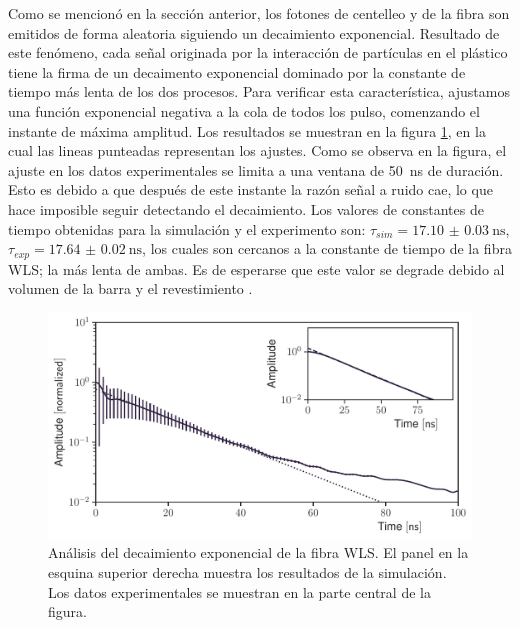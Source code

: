 Como se mencionó en la sección anterior, los fotones de centelleo y de la fibra son emitidos de forma aleatoria siguiendo un decaimiento exponencial. Resultado de este fenómeno, cada señal originada por la interacción de partículas en el plástico tiene la firma de un decaimento exponencial dominado por la constante de tiempo más lenta de los dos procesos. Para verificar esta característica, ajustamos una función exponencial negativa a la cola de todos los pulso, comenzando el instante de máxima amplitud. Los resultados se muestran en la figura \ref{fig:muons-tail}, en la cual las lineas punteadas representan los ajustes. Como se observa en la figura, el ajuste en los datos experimentales se limita a una ventana de \SI{50}{\ns} de duración. Esto es debido a que después de este instante la razón señal a ruido cae, lo que hace imposible seguir detectando el decaimiento. Los valores de constantes de tiempo obtenidas para la simulación y el experimento son: $\tau_{sim}=\SI{17.10(3)}{\ns}$, $\tau_{exp}=\SI{17.64(2)}{\ns}$, los cuales son cercanos a la constante de tiempo de la fibra WLS; la más lenta de ambas. Es de esperarse que este valor se degrade debido al volumen de la barra y el revestimiento \cite{gros18}.

\begin{figure}
        \centering
        \includegraphics[width=\textwidth]{muons-tail-fit.pdf}
        \caption{Análisis del decaimiento exponencial de la fibra WLS. El panel en la esquina superior derecha muestra los resultados de la simulación. Los datos experimentales se muestran en la parte central de la figura.}
        \label{fig:muons-tail}
\end{figure}


